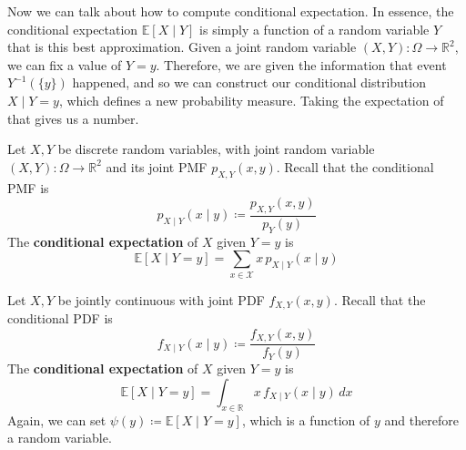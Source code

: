\documentclass{article}
\begin{document}
    Now we can talk about how to compute conditional expectation. In essence, the conditional expectation $\mathbb{E}[X \mid Y]$ is simply a function of a random variable $Y$ that is this best approximation. Given a joint random variable $(X, Y): \Omega \rightarrow \mathbb{R}^2$, we can fix a value of $Y = y$. Therefore, we are given the information that event $Y^{-1}(\{y\})$ happened, and so we can construct our conditional distribution $X \mid Y = y$, which defines a new probability measure. Taking the expectation of that gives us a number. 


    \begin{definition}[Discrete Conditional Expectation Given $Y = y$]
      Let $X, Y$ be discrete random variables, with joint random variable $(X, Y): \Omega \rightarrow \mathbb{R}^2$ and its joint PMF $p_{X, Y} (x, y)$. Recall that the conditional PMF is 
      \begin{equation}
        p_{X\mid Y}(x \mid y) \coloneqq \frac{p_{X, Y} (x, y)}{p_Y (y)}
      \end{equation}
      The \textbf{conditional expectation} of $X$ given $Y = y$ is 
      \begin{equation}
        \mathbb{E}[X \mid Y = y] = \sum_{x \in \mathcal{X}} x \, p_{X \mid Y} (x \mid y)
      \end{equation}
    \end{definition}

    \begin{definition}[Continuous Conditional Expectation Given $Y = y$]
      Let $X, Y$ be jointly continuous with joint PDF $f_{X, Y} (x, y)$. Recall that the conditional PDF is 
      \begin{equation}
        f_{X \mid Y} (x \mid y) \coloneqq \frac{f_{X, Y} (x, y)}{f_Y (y)}
      \end{equation}
      The \textbf{conditional expectation} of $X$ given $Y = y$ is 
      \begin{equation}
        \mathbb{E}[X \mid Y = y] = \int_{x \in \mathbb{R}} x \, f_{X \mid Y} (x \mid y) \, dx
      \end{equation}
      Again, we can set $\psi(y) \coloneqq \mathbb{E}[X \mid Y = y]$, which is a function of $y$ and therefore a random variable. 
    \end{definition}
\end{document}
